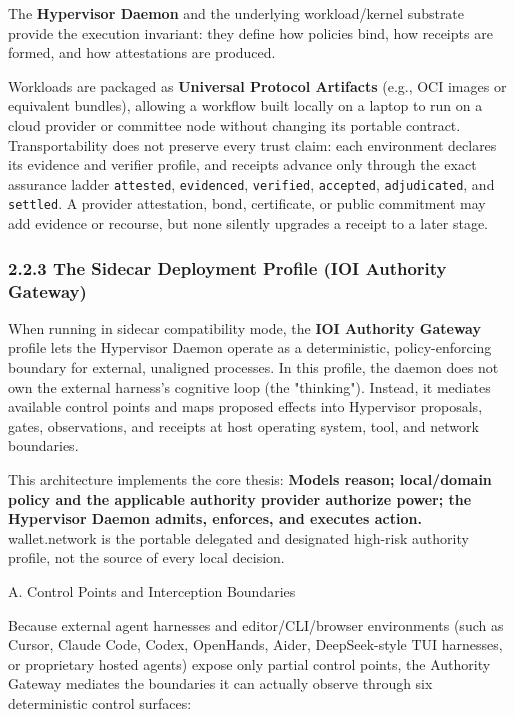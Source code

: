 \documentclass[
  11pt,
]{article}
\begin{document}
The \textbf{Hypervisor Daemon} and the underlying workload/kernel
substrate provide the execution invariant: they define how policies
bind, how receipts are formed, and how attestations are produced.

Workloads are packaged as \textbf{Universal Protocol Artifacts} (e.g.,
OCI images or equivalent bundles), allowing a workflow built locally on
a laptop to run on a cloud provider or committee node without changing its
portable contract. Transportability does not preserve every trust claim:
each environment declares its evidence and verifier profile, and receipts
advance only through the exact assurance ladder \texttt{attested},
\texttt{evidenced}, \texttt{verified}, \texttt{accepted},
\texttt{adjudicated}, and \texttt{settled}. A provider attestation, bond,
certificate, or public commitment may add evidence or recourse, but none
silently upgrades a receipt to a later stage.

\hypertarget{the-sidecar-deployment-profile-ioi-authority-gateway}{%
\subsubsection{2.2.3 The Sidecar Deployment Profile (IOI Authority
Gateway)}\label{the-sidecar-deployment-profile-ioi-authority-gateway}}

When running in sidecar compatibility mode, the \textbf{IOI Authority
Gateway} profile lets the Hypervisor Daemon operate as a deterministic,
policy-enforcing boundary for external, unaligned processes. In this
profile, the daemon does not own the external harness's cognitive loop
(the "thinking"). Instead, it mediates available control points and maps
proposed effects into Hypervisor proposals, gates, observations, and
receipts at host operating system, tool, and network boundaries.

This architecture implements the core thesis: \textbf{Models reason;
local/domain policy and the applicable authority provider authorize power;
the Hypervisor Daemon admits, enforces, and executes action.} wallet.network
is the portable delegated and designated high-risk authority profile, not the
source of every local decision.

A. Control Points and Interception Boundaries

Because external agent harnesses and editor/CLI/browser environments
(such as Cursor, Claude Code, Codex, OpenHands, Aider, DeepSeek-style
TUI harnesses, or proprietary hosted agents) expose only partial control
points, the Authority Gateway mediates the boundaries it can actually
observe through six deterministic control surfaces:
\end{document}
